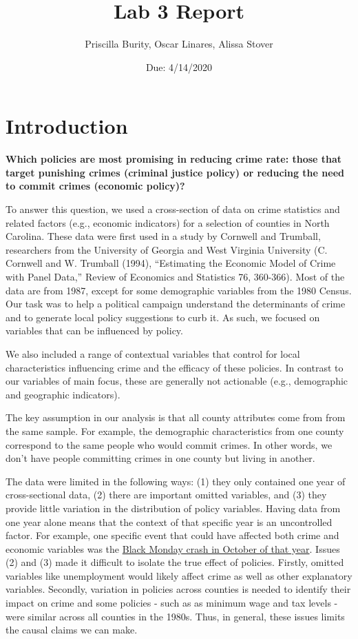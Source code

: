 \documentclass[]{article}
\title{Lab 3 Report}
\author{Priscilla Burity, Oscar Linares, Alissa Stover}
\date{Due: 4/14/2020}
\begin{document}
\maketitle

{
\setcounter{tocdepth}{2}
\tableofcontents
}
\hypertarget{introduction}{%
\section{Introduction}\label{introduction}}

\textbf{Which policies are most promising in reducing crime rate: those
that target punishing crimes (criminal justice policy) or reducing the
need to commit crimes (economic policy)?}

To answer this question, we used a cross-section of data on crime
statistics and related factors (e.g., economic indicators) for a
selection of counties in North Carolina. These data were first used in a
study by Cornwell and Trumball, researchers from the University of
Georgia and West Virginia University (C. Cornwell and W. Trumball
(1994), ``Estimating the Economic Model of Crime with Panel Data,''
Review of Economics and Statistics 76, 360-366). Most of the data are
from 1987, except for some demographic variables from the 1980 Census.
Our task was to help a political campaign understand the determinants of
crime and to generate local policy suggestions to curb it. As such, we
focused on variables that can be influenced by policy.

We also included a range of contextual variables that control for local
characteristics influencing crime and the efficacy of these policies. In
contrast to our variables of main focus, these are generally not
actionable (e.g., demographic and geographic indicators).

The key assumption in our analysis is that all county attributes come
from from the same sample. For example, the demographic characteristics
from one county correspond to the same people who would commit crimes.
In other words, we don't have people committing crimes in one county but
living in another.

The data were limited in the following ways: (1) they only contained one
year of cross-sectional data, (2) there are important omitted variables,
and (3) they provide little variation in the distribution of policy
variables. Having data from one year alone means that the context of
that specific year is an uncontrolled factor. For example, one specific
event that could have affected both crime and economic variables was the
\href{https://en.wikipedia.org/wiki/Black_Monday_(1987)}{Black Monday
crash in October of that year}. Issues (2) and (3) made it difficult to
isolate the true effect of policies. Firstly, omitted variables like
unemployment would likely affect crime as well as other explanatory
variables. Secondly, variation in policies across counties is needed to
identify their impact on crime and some policies - such as as minimum
wage and tax levels - were similar across all counties in the 1980s.
Thus, in general, these issues limits the causal claims we can make.
\end{document}
